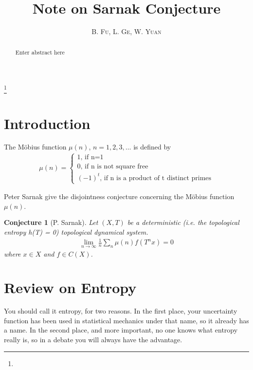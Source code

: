\documentclass[a4paper,10pt]{amsart}
\newtheorem{conjecture}{Conjecture}[section]
\newcommand{\titleinfo}{Note on Sarnak Conjecture}
\newcommand{\authorinfo}{B. Fu, L. Ge, W. Yuan}
\begin{document}
\title{\LARGE\textbf{\titleinfo}} 

\author{\large\textsc{\authorinfo}} 
\address{USTC}  
\email{}

\date{}


\begin{abstract}
Enter abstract here
\end{abstract}


\thanks{}

\maketitle

\section{Introduction}
The M\"{o}bius function $\mu(n)$, $n = 1, 2, 3, \ldots$ is defined by
\begin{align*}
    \mu(n) = \begin{cases}
    1  \mbox{, if n=1}\\
    0  \mbox{, if n is not square free}\\
    (-1)^t \mbox{, if n is a product of t distinct primes}
  \end{cases} 
\end{align*}

Peter Sarnak give the disjointness conjecture concerning the M\"{o}bius 
function $\mu(n)$.
\begin{conjecture}[P. Sarnak]
    Let $(X, T)$ be a deterministic (i.e. the topological entropy h(T) = 0)
    topological dynamical system.
    \begin{align*}
        \lim_{n \rightarrow \infty}\frac{1}{n}\sum_{n}\mu(n)f(T^{n}x) = 0
    \end{align*}
    where $x \in X$ and $f \in C(X)$. 
\end{conjecture}

\section{Review on Entropy}
 \begin{fquote}
    You should call it entropy, for two reasons. In the 
    first place, your uncertainty function has been used in 
    statistical mechanics under that name, so it already has a name. 
    In the second place, and more important, no one knows what entropy
really is, so in a debate you will always have the advantage.
 \end{fquote}
\end{document}
